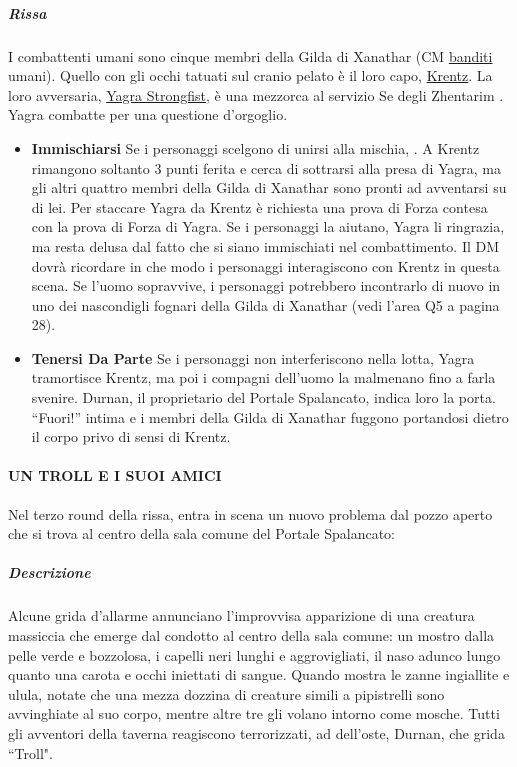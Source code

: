 \documentclass{article}
\begin{document}
                        \subparagraph{Rissa}I combattenti umani sono cinque membri della Gilda
di Xanathar (CM \hyperlink{banditi}{banditi} umani). Quello con gli occhi
tatuati sul cranio pelato è il loro capo, \hyperlink{krent}{ Krentz}. La loro
avversaria, \hyperlink{yagra}{Yagra Strongfist}, è una mezzorca al servizio Se
degli Zhentarim . Yagra combatte per una
questione d'orgoglio.

\begin{itemize}
    \item \textbf{Immischiarsi} Se i personaggi scelgono di unirsi alla mischia, . A Krentz rimangono soltanto 3 punti ferita
e cerca di sottrarsi alla presa di Yagra, ma gli altri quattro
membri della Gilda di Xanathar sono pronti ad avventarsi
su di lei.
Per staccare Yagra da Krentz è richiesta una prova
di Forza contesa con la prova di Forza di Yagra. Se i
personaggi la aiutano, Yagra li ringrazia, ma resta delusa
dal fatto che si siano immischiati nel combattimento.
Il DM dovrà ricordare in che modo i personaggi
interagiscono con Krentz in questa scena. Se l’uomo
sopravvive, i personaggi potrebbero incontrarlo di nuovo
in uno dei nascondigli fognari della Gilda di Xanathar (vedi
l’area Q5 a pagina 28).
\item \textbf{Tenersi Da Parte} Se i personaggi non interferiscono nella lotta, Yagra
tramortisce Krentz, ma poi i compagni dell’uomo la
malmenano fino a farla svenire. Durnan, il proprietario del
Portale Spalancato, indica loro la porta. “Fuori!” intima e i
membri della Gilda di Xanathar fuggono portandosi dietro
il corpo privo di sensi di Krentz.

\end{itemize}

                \paragraph{UN TROLL E I SUOI AMICI}
Nel terzo round della rissa, entra in scena un nuovo
problema dal pozzo aperto che si trova al centro della sala
comune del Portale Spalancato:


                        \subparagraph{Descrizione}Alcune grida d'allarme annunciano l'improvvisa
apparizione di una creatura massiccia che emerge
dal condotto al centro della sala comune: un mostro
dalla pelle verde e bozzolosa, i capelli neri lunghi e
aggrovigliati, il naso adunco lungo quanto una carota
e occhi iniettati di sangue. Quando mostra le zanne
ingiallite e ulula, notate che una mezza dozzina di
creature simili a pipistrelli sono avvinghiate al suo corpo,
mentre altre tre gli volano intorno come mosche. Tutti
gli avventori della taverna reagiscono terrorizzati, ad dell'oste, Durnan, che grida “Troll".
\end{document}
